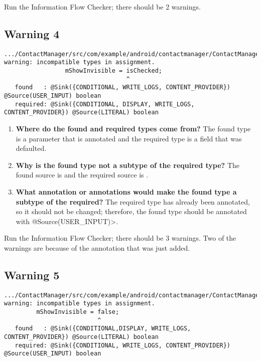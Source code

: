 Run the Information Flow Checker; there should be 2 warnings.
  
  \subsection{Warning 4 }
   \begin{Verbatim}
.../ContactManager/src/com/example/android/contactmanager/ContactManager.java:77: 
warning: incompatible types in assignment.
                 mShowInvisible = isChecked;
                                  ^
   found   : @Sink({CONDITIONAL, WRITE_LOGS, CONTENT_PROVIDER}) @Source(USER_INPUT) boolean
   required: @Sink({CONDITIONAL, DISPLAY, WRITE_LOGS, CONTENT_PROVIDER}) @Source(LITERAL) boolean
    \end{Verbatim} 

 \begin{enumerate}

\item\textbf{Where do the found and required types come from?}
   The found type is a parameter that is annotated and the required type is a field that was 
   defaulted.
\item  \textbf{ Why is the found type not a subtype of the required type?}
  The found source is  and the required source is . 
\item  \textbf{What annotation or annotations would make the found type a subtype of the required?}
  The required type has already been annotated, so it should not be changed; therefore, the
  found type should be annotated with \<@Source(USER\_INPUT)>.\newline
  
  
   \end{enumerate}

Run the Information Flow Checker; there should be 3 warnings.  Two of the warnings are because of the
annotation that was just added.

  \subsection{Warning 5}
   \begin{Verbatim}
.../ContactManager/src/com/example/android/contactmanager/ContactManager.java:63: 
warning: incompatible types in assignment.
         mShowInvisible = false;
                          ^
   found   : @Sink({CONDITIONAL,DISPLAY, WRITE_LOGS, CONTENT_PROVIDER}) @Source(LITERAL) boolean
   required: @Sink({CONDITIONAL, WRITE_LOGS, CONTENT_PROVIDER}) @Source(USER_INPUT) boolean
    \end{Verbatim} 

